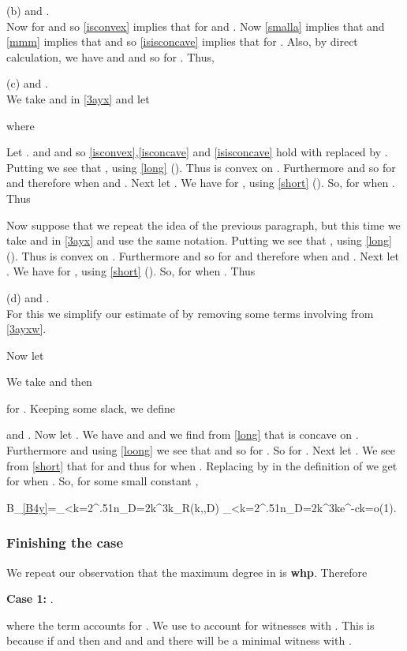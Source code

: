 \documentclass[11pt]{article}
\def\p{\pi}
\def\whp{{\bf whp}}
\newcommand{\beq}[1]{}
\begin{document}
(b)  and .\\
Now  for  and so \eqref{isconvex} implies that 
for  and .
Now \eqref{smalla} implies
that  and \eqref{mmm} implies that  
and so \eqref{isisconcave} implies that  for . Also,
by direct calculation, we have
 and  and so
 for . Thus,


(c)  and .\\
We take  and  in \eqref{3ayx} and let

where 


Let . 
and 
and so \eqref{isconvex},\eqref{isconcave} and \eqref{isisconcave} hold with  replaced by . 
Putting  we see that ,
using \eqref{long} ().
Thus  is convex on . Furthermore  and so  for 
and therefore  when  and .
Next let . We have  
for , using \eqref{short} (). So,
 for  when . Thus 


Now suppose that we repeat the idea of the previous paragraph, but this time we take  and  in \eqref{3ayx}
and use the same notation. Putting  we see that ,
using \eqref{long} ().
Thus  is convex on . Furthermore  and so  for 
and therefore  when  and .
Next let . We have  
for , using \eqref{short} (). So,
 for  when . Thus 


(d)  and .\\ 
For this we simplify our estimate of  by removing some terms involving  from \eqref{3ayxw}.

Now let
 
We take  and then 
 
for . 
Keeping some slack, we define 

and .
Now let . We have  
and  and we find from
\eqref{long} that  is concave on . Furthermore  and 
using \eqref{loong} we see that  and so  for .
So  for .
Next let . We see from \eqref{short} that  for  and thus 
 for  when . 
Replacing  by  in the definition of  we get 
for  when
.
So, for some small constant ,
\beq{B4y}
B_{\ref{B4y}}=\sum_{\ell<k=2}^{.51n}\sum_{D=2k}^{3k}\p_R(k,\ell,D)\leq
\sum_{\ell<k=2}^{.51n}\sum_{D=2k}^{3k}e^{-ck}=o(1).
\eeq
\subsubsection{Finishing the case }\label{combine}
We repeat our observation that the maximum degree  in  is  \whp. Therefore

{\bf Case 1:} .

where the  term accounts for .
We use  to account for witnesses  with . 
This is because if  and  then  and  and 
and there will be a minimal witness  with .
\end{document}
